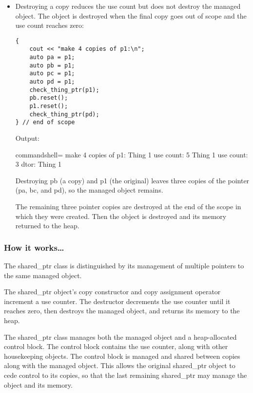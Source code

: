 \begin{itemize}
Output:

\begin{tcblisting}{commandshell={}}
make 4 copies of p1:
Thing 1 use count: 5
Thing 1 use count: 1
\end{tcblisting}

\item 
Destroying a copy reduces the use count but does not destroy the managed object. The object is destroyed when the final copy goes out of scope and the use count reaches zero:

\begin{lstlisting}[style=styleCXX]
{
	cout << "make 4 copies of p1:\n";
	auto pa = p1;
	auto pb = p1;
	auto pc = p1;
	auto pd = p1;
	check_thing_ptr(p1);
	pb.reset();
	p1.reset();
	check_thing_ptr(pd);
} // end of scope
\end{lstlisting}

Output:

\begin{tcblisting}{commandshell={}}
make 4 copies of p1:
Thing 1 use count: 5
Thing 1 use count: 3
dtor: Thing 1
\end{tcblisting}

Destroying pb (a copy) and p1 (the original) leaves three copies of the pointer (pa, bc, and pd), so the managed object remains.

The remaining three pointer copies are destroyed at the end of the scope in which they were created. Then the object is destroyed and its memory returned to the heap.

\end{itemize}

\subsubsection{How it works…}

The shared\_ptr class is distinguished by its management of multiple pointers to the same managed object.

The shared\_ptr object's copy constructor and copy assignment operator increment a use counter. The destructor decrements the use counter until it reaches zero, then destroys the managed object, and returns its memory to the heap. 

The shared\_ptr class manages both the managed object and a heap-allocated control block. The control block contains the use counter, along with other housekeeping objects. The control block is managed and shared between copies along with the managed object. This allows the original shared\_ptr object to cede control to its copies, so that the last remaining shared\_ptr may manage the object and its memory.





























